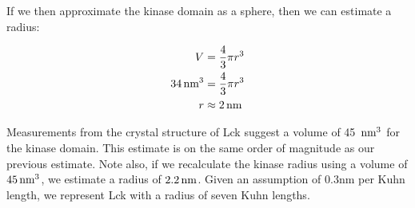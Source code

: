 \documentclass[../AdvancementSummary.tex]{subfiles}
\begin{document}
If we then approximate the kinase domain as a sphere, then we can estimate a radius: 

\begin{align*}
V &= \frac{4}{3}\pi r^3 \\
34 \,\mbox{nm}^3 &= \frac{4}{3} \pi r^3 \\
r &\approx 2 \,\mbox{nm} \\
\end{align*}

Measurements from the crystal structure of Lck suggest a volume of 45 $\,\mbox{nm}^3$ for the kinase domain.  This estimate is on the same order of magnitude as our previous estimate.  Note also, if we recalculate the kinase radius using a volume of $45 \,\mbox{nm}^3$, we estimate a radius of $2.2 \,\mbox{nm}$. Given an assumption of 0.3nm per Kuhn length, we represent Lck with a radius of seven Kuhn lengths.

%
%

%
%


\end{document}
